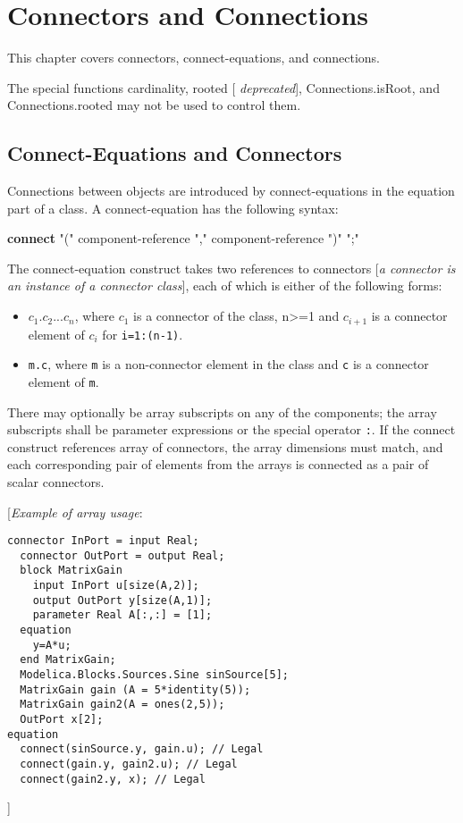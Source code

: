 \chapter{Connectors and Connections}

This chapter covers connectors, connect-equations, and connections.

The special functions cardinality, rooted {[} \emph{deprecated}{]},
Connections.isRoot, and Connections.rooted may not be used to control
them.

\section{Connect-Equations and Connectors}

Connections between objects are introduced by connect-equations in the
equation part of a class. A connect-equation has the following syntax:

\textbf{connect} "(" component-reference "," component-reference ")" ";"

The connect-equation construct takes two references to connectors
{[}\emph{a connector is an instance of a connector class}{]}, each of
which is either of the following forms:

\begin{itemize}
\item
  $c_1.c_2...c_n$,
  where $c_1$ is a connector of the class,
  n\textgreater{}=1 and $c_{i+1}$ is a connector element of
  $c_i$ for \lstinline!i=1:(n-1)!.
\item
  \lstinline!m.c!, where \lstinline!m! is a non-connector element in the class and \lstinline!c! is a
  connector element of \lstinline!m!.
\end{itemize}

There may optionally be array subscripts on any of the components; the
array subscripts shall be parameter expressions or the special operator
\lstinline!:!. If the connect construct references array of connectors, the
array dimensions must match, and each corresponding pair of elements
from the arrays is connected as a pair of scalar connectors.

{[}\emph{Example of array usage}:

\begin{lstlisting}[language=modelica]
  connector InPort = input Real;
  connector OutPort = output Real;
  block MatrixGain
    input InPort u[size(A,2)];
    output OutPort y[size(A,1)];
    parameter Real A[:,:] = [1];
  equation
    y=A*u;
  end MatrixGain;
  Modelica.Blocks.Sources.Sine sinSource[5];
  MatrixGain gain (A = 5*identity(5));
  MatrixGain gain2(A = ones(2,5));
  OutPort x[2];
equation
  connect(sinSource.y, gain.u); // Legal
  connect(gain.y, gain2.u); // Legal
  connect(gain2.y, x); // Legal
\end{lstlisting}
{]}

